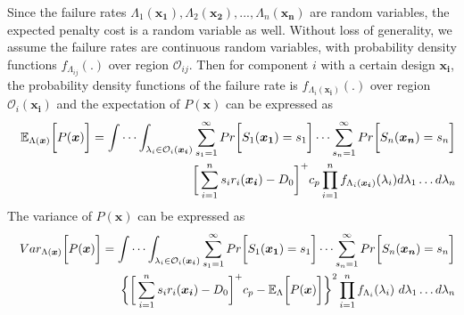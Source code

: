 \documentclass[preprint,12pt]{elsarticle}
\begin{document}
Since the failure rates $\Lambda_{1}(\boldsymbol{x_{1}}),\Lambda_{2}(\boldsymbol{x_{2}}),...,\Lambda_{n}(\boldsymbol{x_{n}})$ are random variables, the expected penalty cost is a random variable as well. Without loss of generality, we assume the failure rates are continuous random variables, with probability density functions $f_{\Lambda_{ij}}(.)$ over region $\mathcal{O}_{ij}$. Then for component $i$ with a certain design $\boldsymbol{x_{i}}$, the probability density functions of the failure rate is $f_{\Lambda_{i}(\boldsymbol{x_{i}})}(.)$ over region $\mathcal{O}_{i}(\boldsymbol{x_{i}})$ and the expectation of $P(\boldsymbol{x})$ can be expressed as
\begin{eqnarray}
&& \mathbb{E}_{\Lambda(\boldsymbol{x})} \bigg[P(\boldsymbol{x}) \bigg]=
\idotsint_{\lambda_{i} \in \mathcal{O}_{i}(\boldsymbol{x_i})} \sum_{s_{1}=1}^{\infty}{ Pr\bigg[S_{1}(\boldsymbol{x_{1}})=s_{1}\bigg]}\dots\sum_{s_{n}=1} ^{\infty}{Pr\bigg[S_{n}(\boldsymbol{x_{n}})=s_{n}\bigg]}\nonumber\\
&&\bigg[\sum_{i=1}^{n}{s_{i}r_{i}(\boldsymbol{x_{i}})}-D_{0}\bigg]^{+}c_{p}\prod_{i=1}^{n}{f_{\Lambda_{i}(\boldsymbol{x_{i}})}(\lambda_{i})d\lambda_{1}\dots d\lambda_{n}} \label{EP2}
\end{eqnarray}
The variance of $P(\boldsymbol{x})$ can be expressed as
\begin{eqnarray}
&&Var_{\Lambda(\boldsymbol{x})} \bigg[ P(\boldsymbol{x}) \bigg]=
\idotsint_{\lambda_{i} \in \mathcal{O}_{i}(\boldsymbol{x_{i}})} \sum_{s_{1}=1}^{\infty}{ Pr\bigg[S_{1}(\boldsymbol{x_{1}})=s_{1}\bigg]}\dots\sum_{s_{n}=1} ^{\infty}{Pr\bigg[S_{n}(\boldsymbol{x_{n}})=s_{n}\bigg]}\nonumber\\
&&\bigg\{\bigg[\sum_{i=1}^{n}{s_{i}r_{i}(\boldsymbol{x_{i}})}-D_{0}\bigg]^{+}c_{p} -\mathbb{E}_{\Lambda} \bigg[ P(\boldsymbol{x}) \bigg]\bigg\}^{2} \prod_{i=1}^{n} f_{\Lambda_{i}}(\lambda_{i}) \ d\lambda_{1}\dots d\lambda_{n}
\end{eqnarray}
\end{document}
